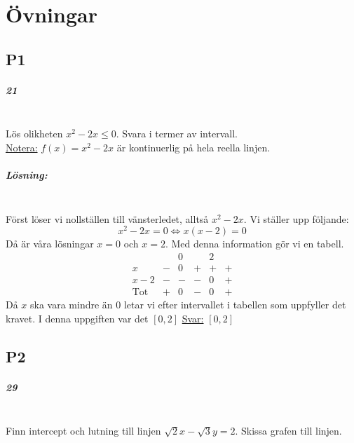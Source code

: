\chapter{Övningar}
\section*{P1}
\paragraph{21}~\\
Lös olikheten $x^2-2x\leq 0$. Svara i termer av intervall.\\
\underline{Notera:} $f(x)=x^2-2x$ är kontinuerlig på hela reella linjen.
\paragraph{Lösning:}~\\
Först löser vi nollställen till vänsterledet, alltså $x^2-2x$.
Vi ställer upp följande:
\begin{equation*}
    x^2-2x=0\Leftrightarrow x(x-2)=0
\end{equation*}
Då är våra lösningar $x=0$ och $x=2$.
Med denna information gör vi en tabell.
\begin{equation*}
    \begin{matrix}
                   &   & 0 &   & 2 &   \\
        x          & - & 0 & + & + & + \\
        x-2        & - & - & - & 0 & + \\
        \text{Tot} & + & 0 & - & 0 & +
    \end{matrix}
\end{equation*}
Då $x$ ska vara mindre än $0$ letar vi efter intervallet i tabellen som uppfyller det kravet.
I denna uppgiften var det $[0,2]$
\underline{Svar:} $[0,2]$
\section*{P2}
\paragraph{29}~\\
Finn intercept och lutning till linjen $\sqrt{2}x-\sqrt{3}y=2$. Skissa grafen till linjen.
